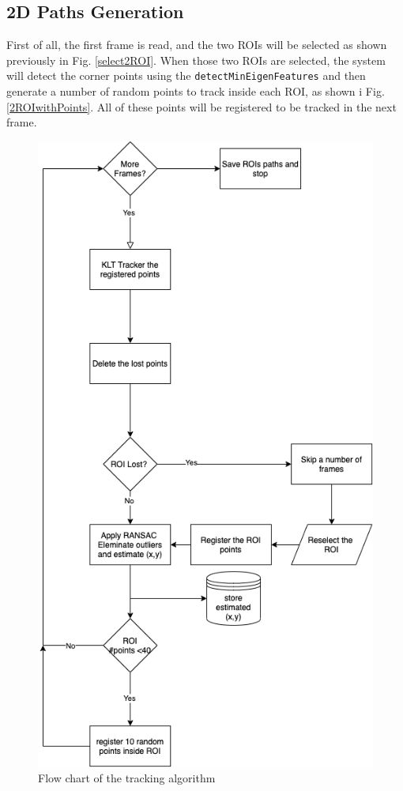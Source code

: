 \documentclass[journal]{IEEEtran}
\begin{document}
\subsection{2D Paths Generation}
First of all, the first frame is read, and the two ROIs will be selected as shown previously in Fig. \ref{select2ROI}. When those two ROIs are selected, the system will detect the corner points using the \texttt{detectMinEigenFeatures} and then generate a number of random points to track inside each ROI, as shown i Fig. \ref{2ROIwithPoints}. All of these points will be registered to be tracked in the next frame.
\begin{figure}[!t]
	\centering
\includegraphics[width=0.85\linewidth]{Report/figures/Tracker_FChart.png}
\caption{Flow chart of the tracking algorithm}
\label{iteration_FChart}
\end{figure}
\end{document}
